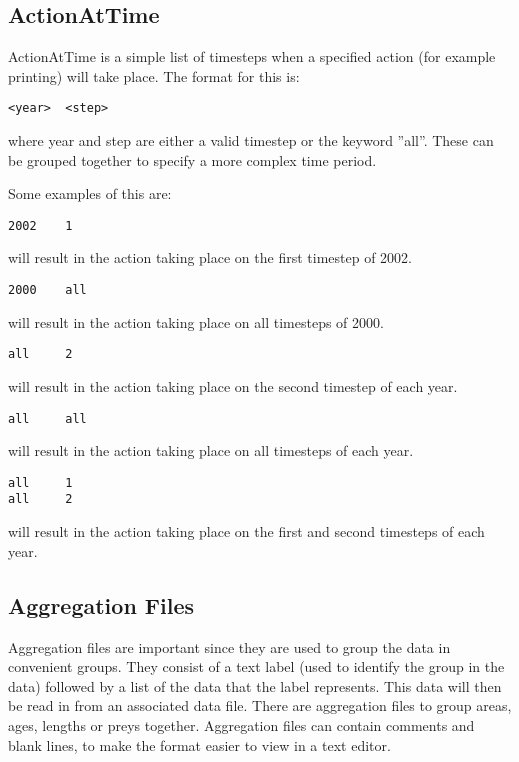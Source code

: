 \documentclass [a4paper, 10pt]{book}
\begin{document}
\subsection{ActionAtTime}
ActionAtTime is a simple list of timesteps when a specified action (for example printing) will take place.  The format for this is:

{\small\begin{verbatim}
<year>  <step>
\end{verbatim}}

where year and step are either a valid timestep or the keyword ''all''.  These can be grouped together to specify a more complex time period.\newline

Some examples of this are:
{\small\begin{verbatim}
2002    1
\end{verbatim}}
will result in the action taking place on the first timestep of 2002.

{\small\begin{verbatim}
2000    all
\end{verbatim}}
will result in the action taking place on all timesteps of 2000.

{\small\begin{verbatim}
all     2
\end{verbatim}}
will result in the action taking place on the second timestep of each year.

{\small\begin{verbatim}
all     all
\end{verbatim}}
will result in the action taking place on all timesteps of each year.

{\small\begin{verbatim}
all     1
all     2
\end{verbatim}}
will result in the action taking place on the first and second timesteps of each year.

\subsection{Aggregation Files}
Aggregation files are important since they are used to group the data in convenient groups.  They consist of a text label (used to identify the group in the data) followed by a list of the data that the label represents.  This data will then be read in from an associated data file.  There are aggregation files to group areas, ages, lengths or preys together.  Aggregation files can contain comments and blank lines, to make the format easier to view in a text editor.
\end{document}
